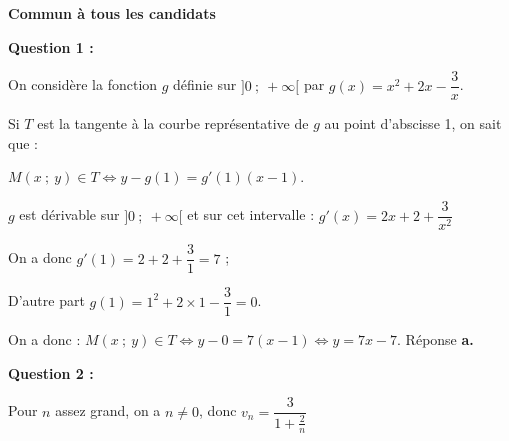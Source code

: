 
\textbf{Commun à tous les candidats}

\medskip

%
%
%
%
%

\textbf{Question 1 :}

On considère la fonction $g$ définie sur $]0~;~+\infty[$  par $g(x)= x^2+ 2x - \dfrac{3}{x}$.

Si $T$ est la tangente à la courbe représentative de $g$ au point d'abscisse 1, on sait que :

$M(x~;~y) \in T \iff y - g(1) = g'(1)(x - 1)$.

\starredbullet $g$ est dérivable sur $]0~;~+\infty[$ et sur cet intervalle : $g'(x) = 2x + 2 + \dfrac{3}{x^2}$

On a donc $g'(1) = 2 + 2 + \dfrac{3}{1} = 7$ ;

\starredbullet D'autre part $g(1) = 1^2 + 2 \times 1 - \dfrac{3}{1} = 0$.

On a donc : $M(x~;~y) \in T \iff y - 0 = 7(x - 1) \iff y = 7x - 7$. Réponse \textbf{a.}

\medskip

\textbf{Question 2 :}


Pour $n$ assez grand, on a $n \ne 0$, donc $v_n = \dfrac{3}{1 + \frac{2}{n}}$


